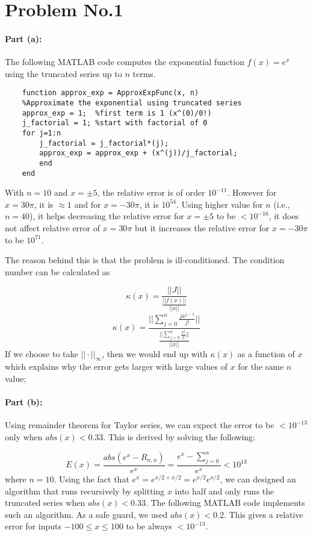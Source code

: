 \section*{Problem No.1} \label{sec:prob1}

\paragraph{Part (a):} 
The following MATLAB code computes the exponential function $f(x)=e^x$ using the truncated series up to $n$ terms. 
\begin{lstlisting}
	function approx_exp = ApproxExpFunc(x, n)
    %Approximate the exponential using truncated series    
    approx_exp = 1;  %first term is 1 (x^(0)/0!)
    j_factorial = 1; %start with factorial of 0
    for j=1:n
        j_factorial = j_factorial*(j);
        approx_exp = approx_exp + (x^(j))/j_factorial;    
    	end
	end
\end{lstlisting}

With $n=10$ and $x=\pm 5$, the relative error is of order $10^{-11}$. However for $x= 30\pi$, it is $\approx 1$ and for $x=-30\pi$, it is $10^{54}$. Using higher value for $n$ (i.e., $n=40$), it helps decreasing the relative error for $x=\pm 5$ to be $ <10^{-16}$, it does not affect relative error of  $x= 30\pi$ but it increases the relative error for  $x=-30\pi$ to be $10^{71}$. 
 
The reason behind this is that the problem is ill-conditioned. The condition number can be calculated as

$$
\kappa(x) = \frac{||J||}{\frac{||f(x)||}{||x||}}
$$
$$
\kappa(x) =\frac{||\sum_{j=0}^{n} \frac{jx^{j-1}}{j!} ||}{\frac{||\sum_{j=0}^{n} \frac{x^{j}}{j!}|| }{||x||} }
$$
If we choose to take $|| \cdot||_{\infty}$, then we would end up with $\kappa(x)$ as a function of $x$ which explains why the error gets larger with large values of $x$ for the same $n$ value;

\paragraph{Part (b):} Using remainder theorem for Taylor series, we can expect the error to be $<10^{-13}$ only when $abs(x) < 0.33$. This is derived by solving the following:

$$
E(x) = \frac{ abs(e^x - R_{n,x})}{e^x} = \frac{e^x - \sum_{j=0}^{n}}{e^x} <10^{13}
$$
where $n=10$. Using the fact that $e^{x} = e^{x/2 + x/2}=e^{x/2}  e^{x/2}$, we can designed an algorithm that runs recursively by splitting $x$ into half and only runs the truncated series when $abs(x) < 0.33$. The following MATLAB code implements such an algorithm. As a safe guard, we used $abs(x)<0.2$. This gives a relative error for inputs $-100 \leq x  \leq 100$ to be always $<10^{-13}$.

